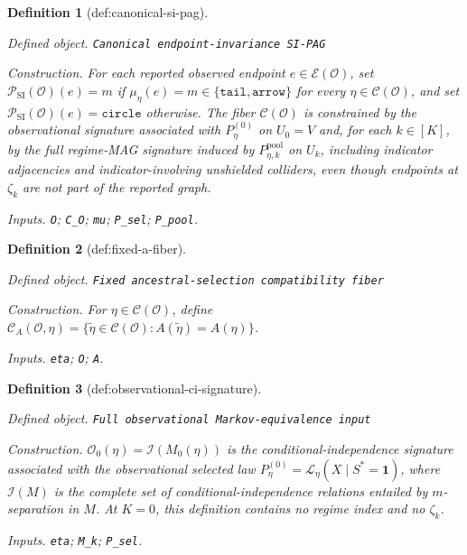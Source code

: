 \documentclass{article}
\newtheorem{definition}{Definition}
\begin{document}
\begin{definition}[def:canonical-si-pag]\label{def:canonical-si-pag}
\par\smallskip\noindent\emph{Defined object.} \texttt{Canonical endpoint-\allowbreak{}invariance SI-\allowbreak{}PAG}
\par\smallskip\noindent\emph{Construction.} For each reported observed endpoint \(e\in\mathcal E(\mathcal O)\), set \(\mathcal P_{\mathrm{SI}}(\mathcal O)(e)=m\) if \(\mu_\eta(e)=m\in\{\mathtt{tail},\mathtt{arrow}\}\) for every \(\eta\in\mathcal C(\mathcal O)\), and set \(\mathcal P_{\mathrm{SI}}(\mathcal O)(e)=\mathtt{circle}\) otherwise. The fiber \(\mathcal C(\mathcal O)\) is constrained by the observational signature associated with \(P_{\eta}^{(0)}\) on \(U_0=V\) and, for each \(k\in[K]\), by the full regime-MAG signature induced by \(P_{\eta,k}^{\mathrm{pool}}\) on \(U_k\), including indicator adjacencies and indicator-involving unshielded colliders, even though endpoints at \(\zeta_k\) are not part of the reported graph.
\par\smallskip\noindent\emph{Inputs.} \texttt{O}; \texttt{C\_\allowbreak{}O}; \texttt{mu}; \texttt{P\_\allowbreak{}sel}; \texttt{P\_\allowbreak{}pool}.
\end{definition}

\begin{definition}[def:fixed-a-fiber]\label{def:fixed-a-fiber}
\par\smallskip\noindent\emph{Defined object.} \texttt{Fixed ancestral-\allowbreak{}selection compatibility fiber}
\par\smallskip\noindent\emph{Construction.} For \(\eta\in\mathcal C(\mathcal O)\), define \(\mathcal C_A(\mathcal O,\eta)=\{\widetilde\eta\in\mathcal C(\mathcal O):A(\widetilde\eta)=A(\eta)\}\).
\par\smallskip\noindent\emph{Inputs.} \texttt{eta}; \texttt{O}; \texttt{A}.
\end{definition}

\begin{definition}[def:observational-ci-signature]\label{def:observational-ci-signature}
\par\smallskip\noindent\emph{Defined object.} \texttt{Full observational Markov-\allowbreak{}equivalence input}
\par\smallskip\noindent\emph{Construction.} \(\mathcal O_0(\eta)=\mathcal I(M_0(\eta))\) is the conditional-independence signature associated with the observational selected law \(P_{\eta}^{(0)}=\mathcal L_{\eta}(X\mid S^*=\mathbf 1)\), where \(\mathcal I(M)\) is the complete set of conditional-independence relations entailed by \(m\)-separation in \(M\). At \(K=0\), this definition contains no regime index and no \(\zeta_k\).
\par\smallskip\noindent\emph{Inputs.} \texttt{eta}; \texttt{M\_\allowbreak{}k}; \texttt{P\_\allowbreak{}sel}.
\end{definition}
\end{document}
